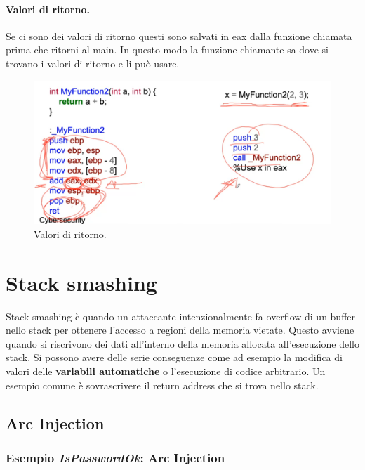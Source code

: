 \paragraph{Valori di ritorno.} Se ci sono dei valori di ritorno questi sono salvati
in eax dalla funzione chiamata prima che ritorni al main. In questo modo la
funzione chiamante sa dove si trovano i valori di ritorno e li può usare.

\begin{figure}[H]
    \centering
    \includegraphics[width=13cm, keepaspectratio]{capitoli/secure_coding/img/cap_2/return_values.png}
    \caption{Valori di ritorno.}\label{fig:ret_values}
\end{figure}

\section{Stack smashing}

Stack smashing è quando un attaccante intenzionalmente fa overflow di un buffer nello
stack per ottenere l'accesso a regioni della memoria vietate.
Questo avviene quando si riscrivono dei dati all'interno della memoria allocata
all'esecuzione dello stack. Si possono avere delle serie conseguenze come ad esempio
la modifica di valori delle \textbf{variabili automatiche} o l'esecuzione di codice
arbitrario. Un esempio comune è sovrascrivere il return address che si trova nello
stack.

\subsection{Arc Injection}

\subsubsection{Esempio \textit{IsPasswordOk}: Arc Injection}

